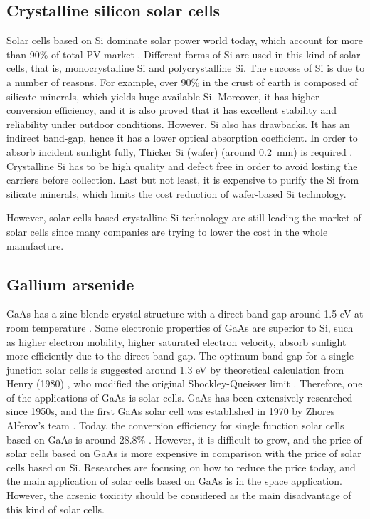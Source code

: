 \documentclass[a4paper, 12pt, titlepage,oneside,drop]{kthesis}
\begin{document}
\subsection{Crystalline silicon solar cells}
Solar cells based on Si dominate solar power world today, which account for more than 90\% of total PV market \cite{hoffmann2006pv}.
Different forms of Si are used in this kind of solar cells, that is, monocrystalline Si and polycrystalline Si. 
The success of Si is due to a number of reasons. For example, over 90\% in the crust of earth is composed of silicate minerals, which yields huge available Si. Moreover, it has higher conversion efficiency, and it is also proved that 
it has excellent stability and reliability under outdoor conditions. However, Si also has drawbacks. It has an indirect band-gap, hence it has a lower optical absorption coefficient. In order to absorb incident sunlight fully, 
Thicker Si (wafer) (around \SI{0.2} {\milli\meter}) is required \cite{brewer2013renewable}. Crystalline Si has to be high quality and defect free in order to avoid losting the carriers before collection. Last but not least, it is expensive to purify the Si from silicate minerals, which
limits the cost reduction of wafer-based Si technology. 

However, solar cells based crystalline Si technology are still leading the market of solar cells since many companies are trying to lower the cost in the whole manufacture.



\subsection{Gallium arsenide}
GaAs has a zinc blende crystal structure with a direct band-gap around 1.5 eV at room temperature \cite{cardona2005fundamentals, madelung1996semiconductors, madelung2004semiconductors}. Some electronic properties of GaAs
are superior to Si, such as higher electron 
mobility, higher saturated electron velocity, absorb sunlight more efficiently due to the direct band-gap. The optimum band-gap for a single junction solar cells is suggested around 1.3 eV by theoretical calculation 
from Henry (1980) \cite{henry1980limiting}, who modified the original Shockley-Queisser limit \cite{shockley1961detailed}. Therefore, one of the applications of GaAs is solar cells. GaAs has been extensively researched
since 1950s, and the first GaAs solar cell was established in
1970 by Zhores Alferov's team \cite{alferov2001nobel}. Today, the conversion efficiency for single function solar cells based on GaAs is around 28.8\% \cite{yablonovitch2012opto}. However, it is difficult to grow, and the
price of solar cells based on GaAs is more expensive in comparison with the price of solar cells based on Si.
Researches are focusing on how to reduce the price today, and the main application of solar cells based on GaAs is in the space application. However, the arsenic toxicity should be considered as the main disadvantage of this kind of 
solar cells. 
\end{document}
